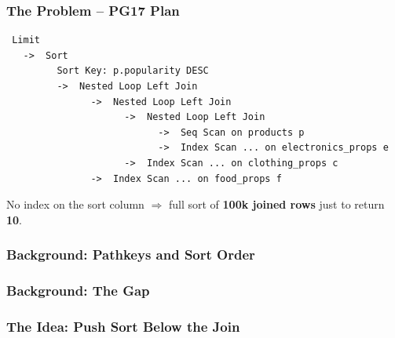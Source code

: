 \documentclass{beamer}
\begin{document}
\begin{frame}[fragile]\frametitle{The Problem -- PG17 Plan}
\begin{lstlisting}
 Limit
   ->  Sort
         Sort Key: p.popularity DESC
         ->  Nested Loop Left Join
               ->  Nested Loop Left Join
                     ->  Nested Loop Left Join
                           ->  Seq Scan on products p
                           ->  Index Scan ... on electronics_props e
                     ->  Index Scan ... on clothing_props c
               ->  Index Scan ... on food_props f
\end{lstlisting}
\bigskip
No index on the sort column $\Rightarrow$ full sort of \textbf{100k joined rows}
just to return \textbf{10}.
\end{frame}


\begin{frame}\frametitle{Background: Pathkeys and Sort Order}
\end{frame}

\begin{frame}\frametitle{Background: The Gap}
\end{frame}


\begin{frame}\frametitle{The Idea: Push Sort Below the Join}
\end{frame}
\end{document}
